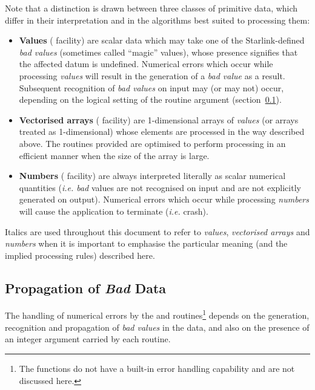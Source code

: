 Note that a distinction is drawn between three classes of primitive data,
which differ in their interpretation and in the algorithms best suited to
processing them:

\begin{itemize}

\item {\bf Values} ( facility) are scalar data which may take one
of the Starlink-defined {\em bad values} (sometimes called ``magic''
values), whose presence signifies that the affected datum is undefined.
Numerical errors which occur while processing {\em values} will result in
the generation of a {\em bad value} as a result.
Subsequent recognition of {\em bad values} on input may (or may not) occur,
depending on the logical setting of the  routine argument
(section~\ref{section:bad}).

\item {\bf Vectorised arrays} ( facility) are 1-dimensional arrays
of {\em values} (or arrays treated as 1-dimensional) whose elements are
processed in the way described above.
The routines provided are optimised to perform processing in an efficient
manner when the size of the array is large.

\item {\bf Numbers} ( facility) are always interpreted literally
as scalar numerical quantities ({\em i.e. bad} values are not recognised on
input and are not explicitly generated on output).
Numerical errors which occur while processing {\em numbers} will cause the
application to terminate ({\em i.e.} crash).

\end{itemize}

Italics are used throughout this document to refer to {\em values}, {\em
vectorised arrays} and {\em numbers} when it is important to emphasise the
particular meaning (and the implied processing rules) described here.

\subsection{Propagation of {\em Bad} Data}
\label{section:bad}

The handling of numerical errors by the  and 
routines\footnote{The  functions do not have a built-in error
handling capability and are not discussed here.}  depends on the generation,
recognition and propagation of {\em bad values} in the data, and also on
the presence of an integer  argument carried by each
routine.

